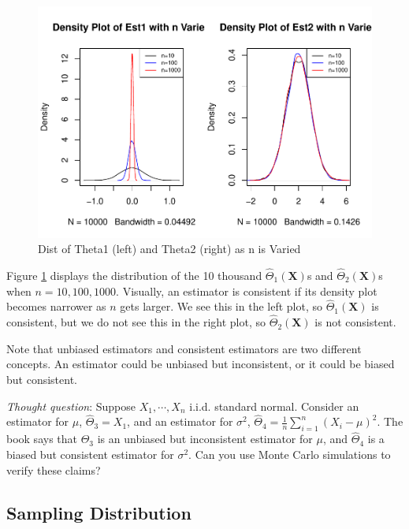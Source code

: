 \documentclass[
]{book}
\begin{document}
\begin{figure}
\centering
\includegraphics{bookdown-demo_files/figure-latex/7-consistent-1.pdf}
\caption{\label{fig:7-consistent}Dist of Theta1 (left) and Theta2 (right) as n is Varied}
\end{figure}

Figure \ref{fig:7-consistent} displays the distribution of the 10 thousand \(\hat{\Theta}_1(\boldsymbol{X})\)s and \(\hat{\Theta}_2(\boldsymbol{X})\)s when \(n=10, 100, 1000\). Visually, an estimator is consistent if its density plot becomes narrower as \(n\) gets larger. We see this in the left plot, so \(\hat{\Theta}_1(\boldsymbol{X})\) is consistent, but we do not see this in the right plot, so \(\hat{\Theta}_2(\boldsymbol{X})\) is not consistent.

Note that unbiased estimators and consistent estimators are two different concepts. An estimator could be unbiased but inconsistent, or it could be biased but consistent.

\emph{Thought question}: Suppose \(X_1, \cdots, X_n\) i.i.d. standard normal. Consider an estimator for \(\mu\), \(\hat{\Theta}_3 = X_1\), and an estimator for \(\sigma^2\), \(\hat{\Theta}_4 = \frac{1}{n} \sum_{i=1}^n (X_i - \mu)^2\). The book says that \(\hat{\Theta}_3\) is an unbiased but inconsistent estimator for \(\mu\), and \(\hat{\Theta}_4\) is a biased but consistent estimator for \(\sigma^2\). Can you use Monte Carlo simulations to verify these claims?

\subsection{Sampling Distribution}\label{sampling-distribution}
\end{document}
